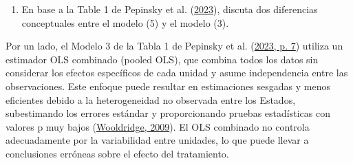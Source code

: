 \documentclass[
  12pt,
  a4paper,
]{article}
\providecommand{\tightlist}{%
  \setlength{\itemsep}{0pt}\setlength{\parskip}{0pt}}
\begin{document}
\begin{table}[h!]
\begin{center}
\caption{\label{tab:table3} Replicación de modelos de efectos directos controlados Pepinsky et al. (2023)}
\label{table:coefficients}
\end{center}
\end{table}

\begin{enumerate}
\def\labelenumi{\alph{enumi})}
\setcounter{enumi}{1}
\tightlist
\item
  En base a la Table 1 de Pepinsky et al. (\protect\hyperlink{ref-pepinsky_modeling_2023}{2023}), discuta dos diferencias conceptuales entre el modelo (5) y el modelo (3).
\end{enumerate}

Por un lado, el Modelo 3 de la Tabla 1 de Pepinsky et al. (\protect\hyperlink{ref-pepinsky_modeling_2023}{2023, p. 7}) utiliza un estimador OLS combinado (pooled OLS), que combina todos los datos sin considerar los efectos específicos de cada unidad y asume independencia entre las observaciones. Este enfoque puede resultar en estimaciones sesgadas y menos eficientes debido a la heterogeneidad no observada entre los Estados, subestimando los errores estándar y proporcionando pruebas estadísticas con valores p muy bajos (\protect\hyperlink{ref-wooldridge_introductory_2009}{Wooldridge, 2009}). El OLS combinado no controla adecuadamente por la variabilidad entre unidades, lo que puede llevar a conclusiones erróneas sobre el efecto del tratamiento.
\end{document}
